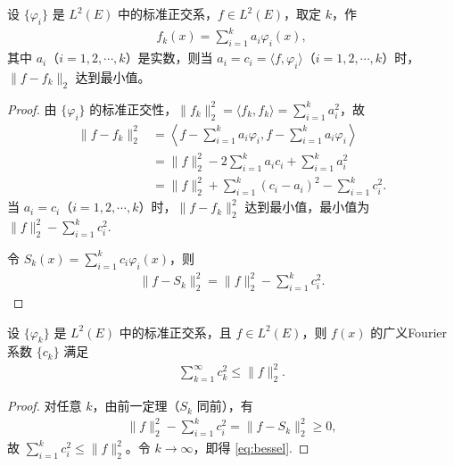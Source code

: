\documentclass[../../main.tex]{subfiles}%
\begin{document}
\begin{theorem}
设 $\{\varphi_i\}$ 是 $L^2(E)$ 中的标准正交系，$f \in L^2(E)$，取定 $k$，作
\begin{align*}
f_k(x) = \sum_{i=1}^k a_i \varphi_i(x),
\end{align*}
其中 $a_i$（$i=1,2,\cdots,k$）是实数，则当 $a_i = c_i = \langle f, \varphi_i \rangle$（$i=1,2,\cdots,k$）时，$\|f - f_k\|_2$ 达到最小值。
\end{theorem}
\begin{proof}

由 $\{\varphi_i\}$ 的标准正交性，$\|f_k\|_2^2 = \langle f_k, f_k \rangle = \sum\limits_{i=1}^k a_i^2$，故
\begin{align*}
\|f - f_k\|_2^2 &= \left\langle f - \sum_{i=1}^k a_i \varphi_i, f - \sum_{i=1}^k a_i \varphi_i \right\rangle \\
&= \|f\|_2^2 - 2\sum_{i=1}^k a_i c_i + \sum_{i=1}^k a_i^2 \\
&= \|f\|_2^2 + \sum_{i=1}^k (c_i - a_i)^2 - \sum_{i=1}^k c_i^2.
\end{align*}
当 $a_i = c_i$（$i=1,2,\cdots,k$）时，$\|f - f_k\|_2^2$ 达到最小值，最小值为 $\|f\|_2^2 - \sum\limits_{i=1}^k c_i^2$.

令 $S_k(x) = \sum\limits_{i=1}^k c_i \varphi_i(x)$，则
\begin{align*}
\|f - S_k\|_2^2 = \|f\|_2^2 - \sum_{i=1}^k c_i^2.
\end{align*}

\end{proof}

\begin{theorem}[Bessel不等式]\label{theorem:实变函数--Bessel不等式}
设 $\{\varphi_k\}$ 是 $L^2(E)$ 中的标准正交系，且 $f \in L^2(E)$，则 $f(x)$ 的广义Fourier系数 $\{c_k\}$ 满足
\begin{align}
\sum_{k=1}^\infty c_k^2 \leqslant \|f\|_2^2. \label{eq:bessel}
\end{align}
\end{theorem}
\begin{proof}

对任意 $k$，由前一定理（$S_k$ 同前），有
\begin{align*}
\|f\|_2^2 - \sum_{i=1}^k c_i^2 = \|f - S_k\|_2^2 \geqslant 0,
\end{align*}
故 $\sum\limits_{i=1}^k c_i^2 \leqslant \|f\|_2^2$。令 $k \to \infty$，即得 \eqref{eq:bessel}.

\end{proof}
\end{document}
